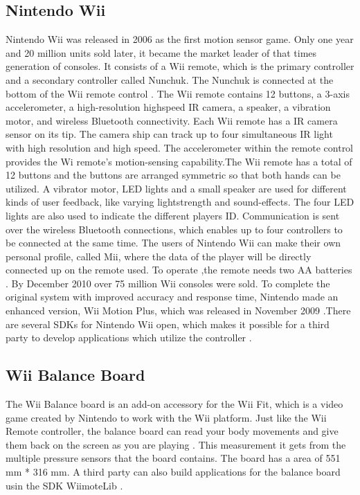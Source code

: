 \subsection{Nintendo Wii}
Nintendo Wii was released in 2006 as the first motion sensor game. Only one year and 20 million units sold later, it became the market leader of  that times generation of consoles. It consists of a Wii remote, which is the primary controller and a secondary controller called Nunchuk. The Nunchuk is connected at the bottom of the Wii remote control \cite{wii} \cite{hackingwii}. The Wii remote contains 12 buttons, a 3-axis accelerometer, a high-resolution highspeed IR camera, a speaker, a vibration motor, and wireless Bluetooth connectivity.
Each Wii remote has a IR camera sensor on its tip. The camera ship can track up to four simultaneous IR light with high resolution and high speed. The accelerometer within the remote control provides the Wi remote’s motion-sensing capability.The Wii remote has a total of 12 buttons and the buttons are arranged symmetric so that both hands can be utilized. A vibrator motor, LED lights and a small speaker are used for different kinds of user feedback, like varying lightstrength and sound-effects. The four LED lights are also used to indicate the different players ID. Communication is sent over the wireless Bluetooth connections, which enables up to four controllers to be connected at the same time.  The users of Nintendo Wii can make their own personal profile, called Mii, where the data of the player will be directly connected up on the remote used. To operate ,the remote needs two AA batteries \cite{hackingwii} \cite{whatiswii}. By December 2010 over 75 million Wii consoles were sold.  To complete the original system with improved accuracy and response time, Nintendo made an enhanced version, Wii Motion Plus, which was released in November 2009 \cite{consoles}.There are several SDKs for Nintendo Wii open, which makes it possible for a third party to develop applications which utilize the controller \cite{comparison}. 

\subsection{Wii Balance Board}
The Wii Balance board is an add-on accessory for the Wii Fit, which is a video game created by Nintendo to work with the Wii platform. Just like the Wii Remote controller, the balance board can read your body movements and give them back on the screen as you are playing \cite{whatiswiifit}. This measurement it gets from the multiple pressure sensors that the board contains. The board has a area of 551 mm {*} 316 mm. A third party can also build applications for the balance board usin the SDK WiimoteLib \cite{comparison}. 

